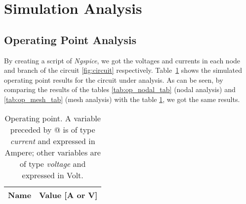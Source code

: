 \section{Simulation Analysis}
\label{sec:simulation}

\subsection{Operating Point Analysis}

By creating a script of \textit{Ngspice}, we got the voltages and currents in each node and branch of
the circuit \ref{fig:circuit} respectively. Table~\ref{tab:op_tab} shows the simulated operating point results for the circuit
under analysis.
\hfill
As can be seen, by comparing the results of the tables \ref{tab:op_nodal_tab} (nodal analysis) and \ref{tab:op_mesh_tab} (mesh analysis)
with the table \ref{tab:op_tab}, we got the same results.

\begin{table}[ht]
  \centering
  \begin{tabular}{|l|r|}
    \hline
    {\bf Name} & {\bf Value [A or V]} \\ \hline
    
  \end{tabular}
  \caption{Operating point. A variable preceded by @ is of type {\em current}
    and expressed in Ampere; other variables are of type {\it voltage} and expressed in
    Volt.}
  \label{tab:op_tab}
\end{table}






